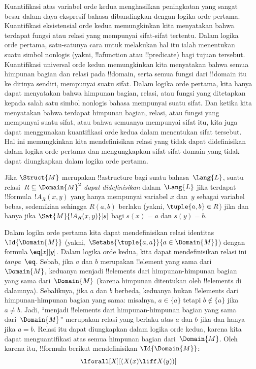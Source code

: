 \documentclass[../../../include/open-logic-section]{subfiles}
\begin{document}

\begin{explain}
Kuantifikasi atas variabel orde kedua menghasilkan peningkatan yang sangat
besar dalam daya ekspresif bahasa dibandingkan dengan logika orde pertama.
Kuantifikasi eksistensial orde kedua memungkinkan kita menyatakan bahwa
terdapat fungsi atau relasi yang mempunyai sifat-sifat tertentu. Dalam logika
orde pertama, satu-satunya cara untuk melakukan hal itu ialah menentukan
suatu simbol nonlogis (yakni, !!a{function} atau !!{predicate}) bagi tujuan
tersebut. Kuantifikasi universal orde kedua memungkinkan kita menyatakan
bahwa semua himpunan bagian dan relasi pada !!{domain}, serta semua fungsi
dari !!{domain} itu ke dirinya sendiri, mempunyai suatu sifat. Dalam
logika orde pertama, kita hanya dapat menyatakan bahwa himpunan bagian,
relasi, atau fungsi yang ditetapkan kepada salah satu simbol nonlogis bahasa
mempunyai suatu sifat. Dan ketika kita menyatakan bahwa terdapat himpunan
bagian, relasi, atau fungsi yang mempunyai suatu sifat, atau bahwa semuanya
mempunyai sifat itu, kita juga dapat menggunakan kuantifikasi orde kedua
dalam menentukan sifat tersebut. Hal ini memungkinkan kita mendefinisikan
relasi yang tidak dapat didefinisikan dalam logika orde pertama dan
mengungkapkan sifat-sifat domain yang tidak dapat diungkapkan dalam logika
orde pertama.
\end{explain}

\begin{defn}
Jika $\Struct{M}$ merupakan !!a{structure} bagi suatu bahasa~$\Lang{L}$,
suatu relasi~$R \subseteq \Domain{M}^2$ \emph{dapat didefinisikan}
dalam~$\Lang{L}$ jika terdapat !!{formula}~$!A_R(x, y)$ yang hanya mempunyai
variabel $x$ dan~$y$ sebagai variabel bebas, sedemikian sehingga $R(a, b)$
berlaku (yakni, $\tuple{a,b} \in R$) jika dan hanya jika
$\Sat{M}{!A_R(x, y)}[s]$ bagi $s(x) = a$ dan $s(y) = b$.
\end{defn}

\begin{ex}
Dalam logika orde pertama kita dapat mendefinisikan relasi
identitas~$\Id{\Domain{M}}$ (yakni, $\Setabs{\tuple{a,a}}{a \in
  \Domain{M}}$) dengan formula $\eq[x][y]$. Dalam logika orde kedua, kita
dapat mendefinisikan relasi ini \emph{tanpa~$\eq$}. Sebab, jika $a$ dan $b$
merupakan !!{element} yang sama dari~$\Domain{M}$, keduanya menjadi
!!{element}s dari himpunan-himpunan bagian yang sama dari~$\Domain{M}$
(karena himpunan ditentukan oleh !!{element}s di dalamnya). Sebaliknya, jika $a$ dan
$b$ berbeda, keduanya bukan !!{element}s dari himpunan-himpunan bagian yang
sama: misalnya, $a \in \{a\}$ tetapi $b \notin \{a\}$ jika $a \neq b$.
Jadi, ``menjadi !!{element}s dari himpunan-himpunan bagian yang sama
dari~$\Domain{M}$'' merupakan relasi yang berlaku atas $a$ dan $b$ jika dan
hanya jika $a = b$. Relasi itu dapat diungkapkan dalam logika orde kedua,
karena kita dapat menguantifikasi atas semua himpunan bagian dari~$\Domain{M}$.
Oleh karena itu, !!{formula} berikut mendefinisikan $\Id{\Domain{M}}$:
\[
\lforall[X][(X(x) \liff X(y))]
\]
\end{ex}
\end{document}
